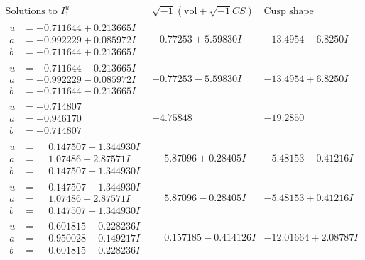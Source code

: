 \documentclass[1p]{elsarticle_modified}
\theoremstyle{definition}
\newcommand{\I}{\sqrt{-1}}
\begin{document}
$$\begin{array}{c|c|c}  
\text{Solutions to }I^u_{1}& \I (\text{vol} + \sqrt{-1}CS) & \text{Cusp shape}\\
 \hline 
\begin{aligned}
u &= -0.711644 + 0.213665 I \\
a &= -0.992229 + 0.085972 I \\
b &= -0.711644 + 0.213665 I\end{aligned}
 & -0.77253 + 5.59830 I & -13.4954 - 6.8250 I \\ \hline\begin{aligned}
u &= -0.711644 - 0.213665 I \\
a &= -0.992229 - 0.085972 I \\
b &= -0.711644 - 0.213665 I\end{aligned}
 & -0.77253 - 5.59830 I & -13.4954 + 6.8250 I \\ \hline\begin{aligned}
u &= -0.714807\phantom{ +0.000000I} \\
a &= -0.946170\phantom{ +0.000000I} \\
b &= -0.714807\phantom{ +0.000000I}\end{aligned}
 & -4.75848\phantom{ +0.000000I} & -19.2850\phantom{ +0.000000I} \\ \hline\begin{aligned}
u &= \phantom{-}0.147507 + 1.344930 I \\
a &= \phantom{-}1.07486 - 2.87571 I \\
b &= \phantom{-}0.147507 + 1.344930 I\end{aligned}
 & \phantom{-}5.87096 + 0.28405 I & -5.48153 - 0.41216 I \\ \hline\begin{aligned}
u &= \phantom{-}0.147507 - 1.344930 I \\
a &= \phantom{-}1.07486 + 2.87571 I \\
b &= \phantom{-}0.147507 - 1.344930 I\end{aligned}
 & \phantom{-}5.87096 - 0.28405 I & -5.48153 + 0.41216 I \\ \hline\begin{aligned}
u &= \phantom{-}0.601815 + 0.228236 I \\
a &= \phantom{-}0.950028 + 0.149217 I \\
b &= \phantom{-}0.601815 + 0.228236 I\end{aligned}
 & \phantom{-}0.157185 - 0.414126 I & -12.01664 + 2.08787 I \\ \hline\begin{aligned}

\end{aligned}
\end{array}$$
\end{document}
